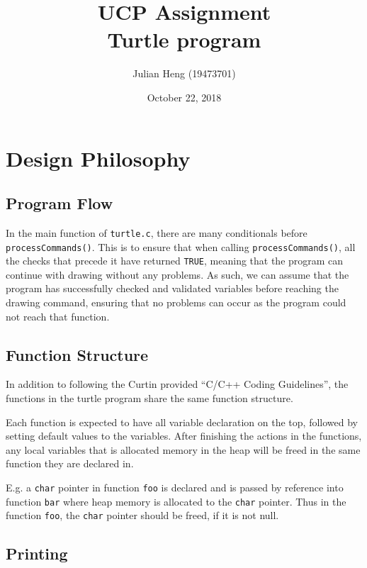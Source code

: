 \documentclass[a4paper, 12pt, titlepage]{article}
\title{\huge \textbf{UCP Assignment\\Turtle program}}
\author{Julian Heng (19473701)}
\date{October 22, 2018}
\newcommand{\code}[1]{\small\texttt{#1}\normalsize}
\begin{document}
\maketitle
\tableofcontents
\newpage

\pagestyle{fancy}

\fancyhf[FC]{\thepage}

\section{Design Philosophy}

\subsection{Program Flow}

In the main function of \code{turtle.c}, there are many conditionals
before \code{processCommands()}. This is to ensure that when calling
\code{processCommands()}, all the checks that precede it have returned
\code{TRUE}, meaning that the program can continue with drawing without any
problems. As such, we can assume that the program has successfully checked
and validated variables before reaching the drawing command, ensuring
that no problems can occur as the program could not reach that function.

\subsection{Function Structure}

In addition to following the Curtin provided ``C/C++ Coding Guidelines'',
the functions in the turtle program share the same function structure.

Each function is expected to have all variable declaration on the top,
followed by setting default values to the variables. After finishing the
actions in the functions, any local variables that is allocated memory
in the heap will be freed in the same function they are declared in.

E.g. a \code{char} pointer in function \code{foo} is declared and is passed
by reference into function \code{bar} where heap memory is allocated to
the \code{char} pointer. Thus in the function \code{foo}, the \code{char}
pointer should be freed, if it is not null.

\subsection{Printing}
\end{document}
